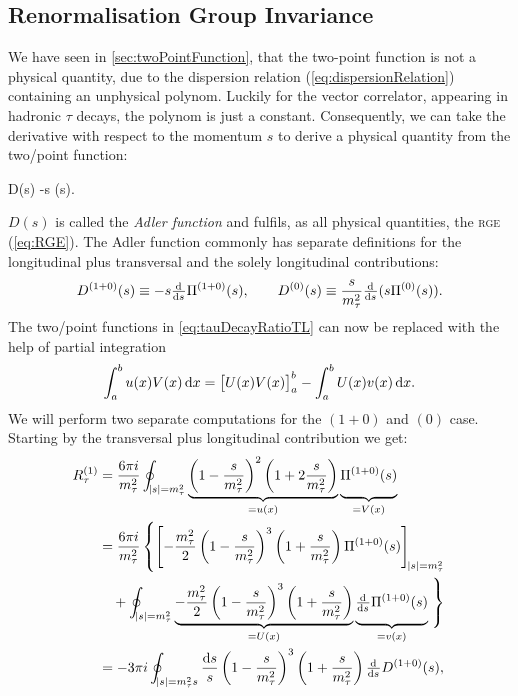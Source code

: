 \documentclass[../../index.tex]{subfiles}
\begin{document}
\subsection{Renormalisation Group Invariance}
We have seen in \cref{sec:twoPointFunction}, that the two-point function is not
a physical quantity, due to the dispersion relation
(\cref{eq:dispersionRelation}) containing an unphysical polynom. Luckily for the
vector correlator, appearing in hadronic \(\tau\) decays, the polynom is just a
constant. Consequently, we can take the derivative with respect to the momentum
\(s\) to derive a physical quantity from the two\-/point function:
\begin{tcolorbox}
  D(s) \equiv -s  \Pi(s).
\end{tcolorbox}
\(D(s)\) is called the \textit{Adler function} and fulfils, as all physical
quantities, the \textsc{rge} (\cref{eq:RGE}). The Adler function commonly has
separate definitions for the longitudinal plus transversal and the solely
longitudinal contributions:
\begin{equation}
  \label{eq:adlerFunction}
  D^{(1+0)}(s) \equiv -s \od{}{s} \Pi^{(1+0)}(s), \qquad D^{(0)}(s) \equiv \frac{s}{m_\tau^2} \od{}{s} (s \Pi^{(0)}(s)).
\end{equation}
The two\-/point functions in \cref{eq:tauDecayRatioTL} can now be replaced with
the help of partial integration
\begin{equation}
  \int_a^b u(x) V(x) \dif x = \left[ U(x) V(x) \right]_a^b - \int_a^b U(x) v(x) \dif x.
\end{equation}
We will perform two separate computations for the \((1+0)\) and \((0)\) case.
Starting by the transversal plus longitudinal contribution we get:
\begin{equation}
  \begin{split}
    R_\tau^{(1)} &= \frac{6 \pi i}{m_\tau^2}
    \oint_{\abs{s}=m_\tau^2}\underbrace{ \left( 1 - \frac{s}{m_\tau^2} \right)^2
      \left( 1 + 2 \frac{s}{m_\tau^2} \right)
    }_{= u(x)} \underbrace{ \vphantom{\left( \frac{s}{m_\tau^2} \right)} \Pi^{(1+0)}(s)}_{=V(x)} \\
    &= \frac{6 \pi i}{m_\tau^2} \left\{ \left[ -\frac{m_\tau^2}{2} \left( 1 -
          \frac{s}{m_\tau^2} \right)^3 \left( 1 + \frac{s}{m_\tau^2} \right)
        \Pi^{(1+0)}(s) \right]_{\abs{s}=m_\tau^2} \right. \\
    &\quad+ \oint_{\abs{s}=m_\tau^2} \underbrace{-\frac{m_\tau^2}{2} \left( 1 -
        \frac{s}{m_\tau^2} \right)^3 \left( 1 + \frac{s}{m_\tau^2} \right)
    }_{=U(x)} \underbrace{\vphantom{\left( \frac{1}{m_\tau^2} \right)}\od{}{s}
      \Pi^{(1+0)}(s)}_{=v(x)}
    \left. \vphantom{\left[ \left( \frac{1}{m_\tau^2} \right) \right]} \right\} \\
    &= -3 \pi i \oint_{\abs{s}=m_\tau^2s} \frac{\dif s}{s} \left( 1 -
      \frac{s}{m_\tau^2} \right)^3 \left( 1 + \frac{s}{m_\tau^2} \right)
    \od{}{s} D^{(1+0)}(s),
  \end{split}
\end{equation}
\end{document}
